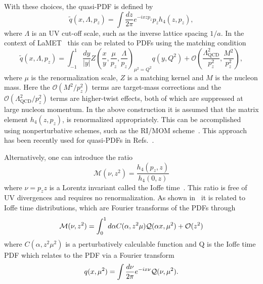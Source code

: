 With these choices, the quasi-PDF is defined by
\begin{equation}
\widetilde{q}(x,\Lambda,p_z)  
=   \int \frac{dz}{2\pi} e^{-i x z p_z} p_z h_4(z,p_z), 
\end{equation}
where $\Lambda$ is an UV cut-off scale, such as the inverse lattice spacing 
$1/a$. 
In the context of LaMET~\cite{Ji:2013dva,Ji:2014gla}
 this can be related to PDFs using the matching condition
%
\begin{equation} \label{eq:qPDFmatching}
\widetilde{q}(x,\Lambda ,p_z) = 
  \int_{-1}^1 \frac{dy}{\left\vert y\right\vert} 
    Z\left( \frac{x}{y}, \frac{\mu}{p_z}, \frac{\Lambda}{p_z}\right)_{\mu^2 = Q^2} q(y,Q^2) +
  \mathcal{O}\left( \frac{\Lambda_\text{QCD}^2}{p_z^2},\frac{M^2}{p_z^2}\right), 
\end{equation}
where $\mu$ is the renormalization scale,
$Z$ is a matching kernel and $M$ is the nucleon mass.
Here the $\mathcal{O}\left(M^2/p_z^2\right)$ terms are target-mass corrections 
and the $\mathcal{O}\left(\Lambda_\text{QCD}^2/p_z^2\right)$ terms are 
higher-twist effects, both of which are suppressed at large nucleon momentum. 
In the above construction it is assumed that the matrix element  $h_4(z,p_z)$, is renormalized appropriately. 
This can be accomplished using nonperturbative schemes, such as the 
RI/MOM scheme~\cite{Martinelli:1994ty}. This approach has been recently used  for quasi-PDFs  in Refs.~\cite{Alexandrou:2017huk,Chen:2017mzz,Green:2017xeu}.

Alternatively, one can introduce the ratio
\begin{equation}
{\mathcal M}(\nu,z^2) =\frac{h_4(p_z,z)}{ h_4(0,z)}
\label{eq:RatioPseudo}
\end{equation}
where $\nu = p_z z$ is a Lorentz invariant called the Ioffe time~\cite{Ioffe:1969kf,Braun:1994jq}. This ratio is free of UV divergences and requires no renormalization. As shown in~\cite{Radyushkin:2016hsy,Radyushkin:2017cyf} it is related to Ioffe time distributions, which are Fourier transforms of the PDFs through
\begin{equation}
{\mathcal M}(\nu,z^2) =\int_0^1 d\alpha C(\alpha,z^2\mu) {\cal Q}(\alpha x,\mu^2) +{ \cal O}(z^2)
\label{eq:MatchPseudo}
\end{equation}
where  $C(\alpha,z^2\mu^2) $ is a perturbatively calculable function and {\cal Q} is the Ioffe time PDF which relates to the PDF via a Fourier transform 
\begin{equation}
{q}(x,\mu^2)=\int \frac{d\nu}{2\pi} e^{-ix\nu} {\cal Q}(\nu,\mu^2).
\end{equation}


